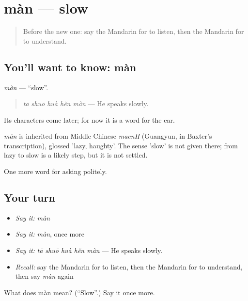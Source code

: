 \section[màn]{màn — slow}

\label{lesson:ZH-C53-man}



\begin{quote}
Before the new one: say the Mandarin for to listen, then the Mandarin for to understand.
\end{quote}

\subsection*{You'll want to know: màn}
\emph{màn} — \textquotedblleft{}slow\textquotedblright{}.

\begin{quote}
\emph{tā shuō huà hěn màn} — He speaks slowly.
\end{quote}

Its characters come later; for now it is a word for the ear.

\begin{cousinweb}
\emph{màn} is inherited from Middle Chinese \emph{maenH} (Guangyun, in Baxter's transcription), glossed 'lazy, haughty'. The sense 'slow' is not given there; from lazy to slow is a likely step, but it is not settled.
\end{cousinweb}

\begin{grammarlens}[title={What you've built}]
One more word for asking politely.
\end{grammarlens}

\subsection*{Your turn}
\begin{itemize}
\raggedright
  \item \emph{Say it:} \emph{màn}
  \item \emph{Say it:} \emph{màn}, once more
  \item \emph{Say it:} \emph{tā shuō huà hěn màn} — He speaks slowly.
  \item \emph{Recall:} say the Mandarin for to listen, then the Mandarin for to understand, then say \emph{màn} again
\end{itemize}

\begin{tcolorbox}[breakable,colback=teal!4,colframe=teal!35!black,title={Before you move on}]
What does màn mean? (\textquotedblleft{}Slow\textquotedblright{}.) Say it once more.
\end{tcolorbox}

